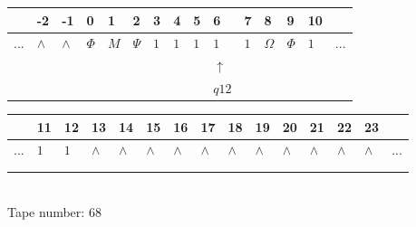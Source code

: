 \documentclass[11pt]{article}
\begin{document}
\begin{table}[H]
\centering
\begin{tabular}{lllllllllllllll}
 & -2 & -1 & 0 & 1 & 2 & 3 & 4 & 5 & 6 & 7 & 8 & 9 & 10 & \\
\hline
$...$ & \multicolumn{1}{|l|}{$\wedge$} & \multicolumn{1}{|l|}{$\wedge$} & \multicolumn{1}{|l|}{$\Phi$} & \multicolumn{1}{|l|}{$M$} & \multicolumn{1}{|l|}{$\Psi$} & \multicolumn{1}{|l|}{$1$} & \multicolumn{1}{|l|}{$1$} & \multicolumn{1}{|l|}{$1$} & \multicolumn{1}{|l|}{$1$} & \multicolumn{1}{|l|}{$1$} & \multicolumn{1}{|l|}{$\Omega$} & \multicolumn{1}{|l|}{$\Phi$} & \multicolumn{1}{|l|}{$1$} & $...$\\
\hline
&  &  &  &  &  &  &  &  & $\uparrow$ &  &  &  &  &  \\
&  &  &  &  &  &  &  &  & $ q12 $ &  &  &  &  &  \\
\end{tabular}
\begin{tabular}{lllllllllllllll}
 & 11 & 12 & 13 & 14 & 15 & 16 & 17 & 18 & 19 & 20 & 21 & 22 & 23 & \\
\hline
$...$ & \multicolumn{1}{|l|}{$1$} & \multicolumn{1}{|l|}{$1$} & \multicolumn{1}{|l|}{$\wedge$} & \multicolumn{1}{|l|}{$\wedge$} & \multicolumn{1}{|l|}{$\wedge$} & \multicolumn{1}{|l|}{$\wedge$} & \multicolumn{1}{|l|}{$\wedge$} & \multicolumn{1}{|l|}{$\wedge$} & \multicolumn{1}{|l|}{$\wedge$} & \multicolumn{1}{|l|}{$\wedge$} & \multicolumn{1}{|l|}{$\wedge$} & \multicolumn{1}{|l|}{$\wedge$} & \multicolumn{1}{|l|}{$\wedge$} & $...$\\
\hline
&  &  &  &  &  &  &  &  &  &  &  &  &  &  \\
&  &  &  &  &  &  &  &  &  &  &  &  &  &  \\
\end{tabular}
\\
Tape number: 68
\noindent\makebox[\linewidth]{\hdashrule{\textwidth}{1pt}{1pt}}\end{table}
\end{document}
